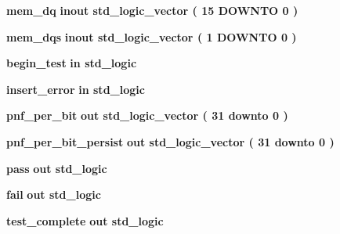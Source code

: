 \begin{DoxyCompactItemize}
\item 
{\bf mem\+\_\+dq}  {\bfseries {\bfseries \textcolor{keywordflow}{inout}\textcolor{vhdlchar}{ }}} {\bfseries \textcolor{comment}{std\+\_\+logic\+\_\+vector}\textcolor{vhdlchar}{ }\textcolor{vhdlchar}{(}\textcolor{vhdlchar}{ }\textcolor{vhdlchar}{ } \textcolor{vhdldigit}{15} \textcolor{vhdlchar}{ }\textcolor{keywordflow}{D\+O\+W\+N\+TO}\textcolor{vhdlchar}{ }\textcolor{vhdlchar}{ } \textcolor{vhdldigit}{0} \textcolor{vhdlchar}{ }\textcolor{vhdlchar}{)}\textcolor{vhdlchar}{ }} 
\item 
{\bf mem\+\_\+dqs}  {\bfseries {\bfseries \textcolor{keywordflow}{inout}\textcolor{vhdlchar}{ }}} {\bfseries \textcolor{comment}{std\+\_\+logic\+\_\+vector}\textcolor{vhdlchar}{ }\textcolor{vhdlchar}{(}\textcolor{vhdlchar}{ }\textcolor{vhdlchar}{ } \textcolor{vhdldigit}{1} \textcolor{vhdlchar}{ }\textcolor{keywordflow}{D\+O\+W\+N\+TO}\textcolor{vhdlchar}{ }\textcolor{vhdlchar}{ } \textcolor{vhdldigit}{0} \textcolor{vhdlchar}{ }\textcolor{vhdlchar}{)}\textcolor{vhdlchar}{ }} 
\item 
{\bf begin\+\_\+test}  {\bfseries {\bfseries \textcolor{keywordflow}{in}\textcolor{vhdlchar}{ }}} {\bfseries \textcolor{comment}{std\+\_\+logic}\textcolor{vhdlchar}{ }} 
\item 
{\bf insert\+\_\+error}  {\bfseries {\bfseries \textcolor{keywordflow}{in}\textcolor{vhdlchar}{ }}} {\bfseries \textcolor{comment}{std\+\_\+logic}\textcolor{vhdlchar}{ }} 
\item 
{\bf pnf\+\_\+per\+\_\+bit}  {\bfseries {\bfseries \textcolor{keywordflow}{out}\textcolor{vhdlchar}{ }}} {\bfseries \textcolor{comment}{std\+\_\+logic\+\_\+vector}\textcolor{vhdlchar}{ }\textcolor{vhdlchar}{(}\textcolor{vhdlchar}{ }\textcolor{vhdlchar}{ } \textcolor{vhdldigit}{31} \textcolor{vhdlchar}{ }\textcolor{keywordflow}{downto}\textcolor{vhdlchar}{ }\textcolor{vhdlchar}{ } \textcolor{vhdldigit}{0} \textcolor{vhdlchar}{ }\textcolor{vhdlchar}{)}\textcolor{vhdlchar}{ }} 
\item 
{\bf pnf\+\_\+per\+\_\+bit\+\_\+persist}  {\bfseries {\bfseries \textcolor{keywordflow}{out}\textcolor{vhdlchar}{ }}} {\bfseries \textcolor{comment}{std\+\_\+logic\+\_\+vector}\textcolor{vhdlchar}{ }\textcolor{vhdlchar}{(}\textcolor{vhdlchar}{ }\textcolor{vhdlchar}{ } \textcolor{vhdldigit}{31} \textcolor{vhdlchar}{ }\textcolor{keywordflow}{downto}\textcolor{vhdlchar}{ }\textcolor{vhdlchar}{ } \textcolor{vhdldigit}{0} \textcolor{vhdlchar}{ }\textcolor{vhdlchar}{)}\textcolor{vhdlchar}{ }} 
\item 
{\bf pass}  {\bfseries {\bfseries \textcolor{keywordflow}{out}\textcolor{vhdlchar}{ }}} {\bfseries \textcolor{comment}{std\+\_\+logic}\textcolor{vhdlchar}{ }} 
\item 
{\bf fail}  {\bfseries {\bfseries \textcolor{keywordflow}{out}\textcolor{vhdlchar}{ }}} {\bfseries \textcolor{comment}{std\+\_\+logic}\textcolor{vhdlchar}{ }} 
\item 
{\bf test\+\_\+complete}  {\bfseries {\bfseries \textcolor{keywordflow}{out}\textcolor{vhdlchar}{ }}} {\bfseries \textcolor{comment}{std\+\_\+logic}\textcolor{vhdlchar}{ }} 
\end{DoxyCompactItemize}


